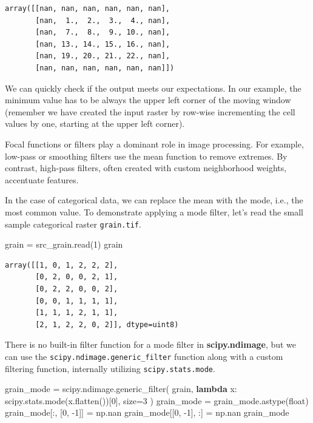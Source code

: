 \documentclass[
  letterpaper,
]{krantz}
\newenvironment{Shaded}{\begin{snugshade}}{\end{snugshade}}
\newcommand{\BuiltInTok}[1]{\textcolor[rgb]{0.00,0.23,0.31}{#1}}
\newcommand{\DecValTok}[1]{\textcolor[rgb]{0.68,0.00,0.00}{#1}}
\newcommand{\KeywordTok}[1]{\textcolor[rgb]{0.00,0.23,0.31}{\textbf{#1}}}
\newcommand{\NormalTok}[1]{\textcolor[rgb]{0.00,0.23,0.31}{#1}}
\newcommand{\OperatorTok}[1]{\textcolor[rgb]{0.37,0.37,0.37}{#1}}
\begin{document}
\begin{verbatim}
array([[nan, nan, nan, nan, nan, nan],
       [nan,  1.,  2.,  3.,  4., nan],
       [nan,  7.,  8.,  9., 10., nan],
       [nan, 13., 14., 15., 16., nan],
       [nan, 19., 20., 21., 22., nan],
       [nan, nan, nan, nan, nan, nan]])
\end{verbatim}

We can quickly check if the output meets our expectations. In our
example, the minimum value has to be always the upper left corner of the
moving window (remember we have created the input raster by row-wise
incrementing the cell values by one, starting at the upper left corner).

Focal functions or filters play a dominant role in image processing. For
example, low-pass or smoothing filters use the mean function to remove
extremes. By contrast, high-pass filters, often created with custom
neighborhood weights, accentuate features.

In the case of categorical data, we can replace the mean with the mode,
i.e., the most common value. To demonstrate applying a mode filter,
let's read the small sample categorical raster \texttt{grain.tif}.

\begin{Shaded}
\begin{Highlighting}[]
\NormalTok{grain }\OperatorTok{=}\NormalTok{ src\_grain.read(}\DecValTok{1}\NormalTok{)}
\NormalTok{grain}
\end{Highlighting}
\end{Shaded}

\begin{verbatim}
array([[1, 0, 1, 2, 2, 2],
       [0, 2, 0, 0, 2, 1],
       [0, 2, 2, 0, 0, 2],
       [0, 0, 1, 1, 1, 1],
       [1, 1, 1, 2, 1, 1],
       [2, 1, 2, 2, 0, 2]], dtype=uint8)
\end{verbatim}

There is no built-in filter function for a mode filter in
\textbf{scipy.ndimage}, but we can use the
\texttt{scipy.ndimage.generic\_filter} function along with a custom
filtering function, internally utilizing \texttt{scipy.stats.mode}.

\begin{Shaded}
\begin{Highlighting}[]
\NormalTok{grain\_mode }\OperatorTok{=}\NormalTok{ scipy.ndimage.generic\_filter(}
\NormalTok{    grain, }
    \KeywordTok{lambda}\NormalTok{ x: scipy.stats.mode(x.flatten())[}\DecValTok{0}\NormalTok{], }
\NormalTok{    size}\OperatorTok{=}\DecValTok{3}
\NormalTok{)}
\NormalTok{grain\_mode }\OperatorTok{=}\NormalTok{ grain\_mode.astype(}\BuiltInTok{float}\NormalTok{)}
\NormalTok{grain\_mode[:, [}\DecValTok{0}\NormalTok{, }\OperatorTok{{-}}\DecValTok{1}\NormalTok{]] }\OperatorTok{=}\NormalTok{ np.nan}
\NormalTok{grain\_mode[[}\DecValTok{0}\NormalTok{, }\OperatorTok{{-}}\DecValTok{1}\NormalTok{], :] }\OperatorTok{=}\NormalTok{ np.nan}
\NormalTok{grain\_mode}
\end{Highlighting}
\end{Shaded}
\end{document}
